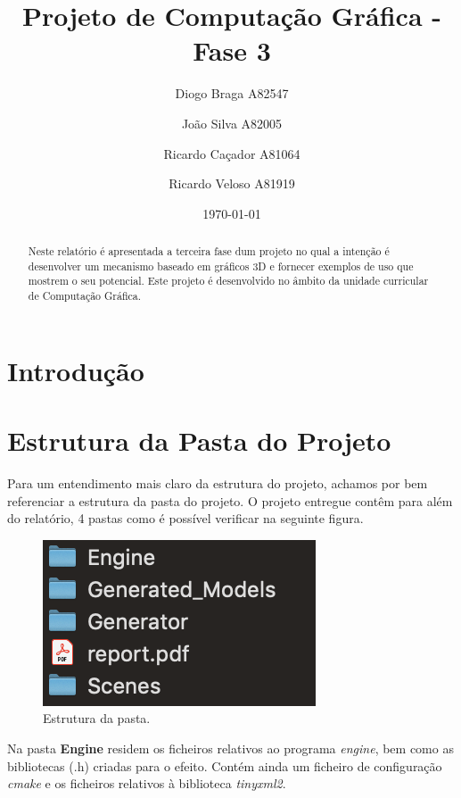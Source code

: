 \documentclass[a4paper]{article}
\title{Projeto de Computação Gráfica - Fase 3}
\author{Diogo Braga A82547 \and João Silva A82005 \and Ricardo Caçador A81064
\and Ricardo Veloso A81919}
\date{\today}
\begin{document}
\maketitle

\begin{abstract}
Neste relatório é apresentada a terceira fase dum projeto no qual a intenção é desenvolver um mecanismo baseado em gráficos 3D e fornecer exemplos de uso que mostrem o seu potencial. Este projeto é desenvolvido no âmbito da unidade curricular de Computação Gráfica.
\end{abstract}


\newpage

\tableofcontents


\newpage

\section{Introdução}
\label{sec:intro}



\section{Estrutura da Pasta do Projeto}
\label{sec:estrutura}

Para um entendimento mais claro da estrutura do projeto, achamos por bem referenciar a estrutura da pasta do projeto.
O projeto entregue contêm para além do relatório, 4 pastas como é possível verificar na seguinte figura.

\begin{figure}[H]
\centering
\includegraphics[scale=1.0]{estrutura.png}
\caption{Estrutura da pasta.}
\label{img:estrutura}
\end{figure}

Na pasta \textbf{Engine} residem os ficheiros relativos ao programa \emph{engine}, bem como as bibliotecas (.h) criadas para o efeito. Contém ainda um ficheiro de configuração \emph{cmake} e os ficheiros relativos à biblioteca \emph{tinyxml2}.
\end{document}
